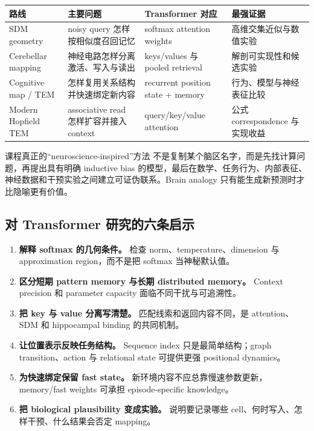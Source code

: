 \documentclass[a4paper]{article}
\begin{document}
\begin{longtable}{@{}L{0.18\textwidth}L{0.24\textwidth}L{0.25\textwidth}L{0.21\textwidth}@{}}
\toprule
路线 & 主要问题 & Transformer 对应 & 最强证据 \\
\midrule
SDM geometry & noisy query 怎样按相似度召回记忆 & softmax attention weights & 高维交集近似与数值实验 \\
Cerebellar mapping & 神经电路怎样分离激活、写入与读出 & keys/values 与 pooled retrieval & 解剖可实现性和候选实验 \\
Cognitive map / TEM & 怎样复用关系结构并快速绑定新内容 & recurrent position state + memory & 行为、模型与神经表征比较 \\
Modern Hopfield TEM & associative read 怎样扩容并接入 context & query/key/value attention & 公式 correspondence 与实现收益 \\
\bottomrule
\end{longtable}

\begin{importantbox}{课程真正的“neuroscience-inspired”方法}
不是复制某个脑区名字，而是先找计算问题，再提出具有明确 inductive bias 的模型，最后在数学、任务行为、内部表征、神经数据和干预实验之间建立可证伪联系。Brain analogy 只有能生成新预测时才比隐喻更有价值。
\end{importantbox}

\subsection{对 Transformer 研究的六条启示}

\begin{enumerate}
  \item \textbf{解释 softmax 的几何条件。} 检查 norm、temperature、dimension 与 approximation region，而不是把 softmax 当神秘默认值。
  \item \textbf{区分短期 pattern memory 与长期 distributed memory。} Context precision 和 parameter capacity 面临不同干扰与可追溯性。
  \item \textbf{把 key 与 value 分离写清楚。} 匹配线索和返回内容不同，是 attention、SDM 和 hippocampal binding 的共同机制。
  \item \textbf{让位置表示反映任务结构。} Sequence index 只是最简单结构；graph transition、action 与 relational state 可提供更强 positional dynamics。
  \item \textbf{为快速绑定保留 fast state。} 新环境内容不应总靠慢速参数更新，memory/fast weights 可承担 episode-specific knowledge。
  \item \textbf{把 biological plausibility 变成实验。} 说明要记录哪些 cell、何时写入、怎样干预、什么结果会否定 mapping。
\end{enumerate}
\end{document}
